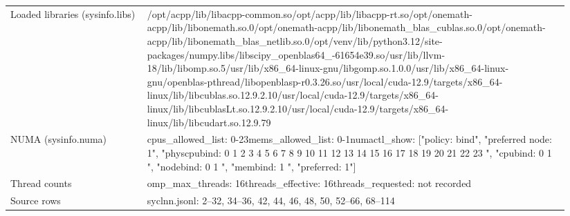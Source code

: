 \begin{longtable}{>{\raggedright\arraybackslash}p{0.23\linewidth}>{\raggedright\arraybackslash}p{0.71\linewidth}}
Loaded libraries (sysinfo.libs) & /\allowbreak{}opt/\allowbreak{}acpp/\allowbreak{}lib/\allowbreak{}libacpp-common.so\newline /\allowbreak{}opt/\allowbreak{}acpp/\allowbreak{}lib/\allowbreak{}libacpp-rt.so\newline /\allowbreak{}opt/\allowbreak{}onemath-acpp/\allowbreak{}lib/\allowbreak{}libonemath.so.0\newline /\allowbreak{}opt/\allowbreak{}onemath-acpp/\allowbreak{}lib/\allowbreak{}libonemath\_\allowbreak{}blas\_\allowbreak{}cublas.so.0\newline /\allowbreak{}opt/\allowbreak{}onemath-acpp/\allowbreak{}lib/\allowbreak{}libonemath\_\allowbreak{}blas\_\allowbreak{}netlib.so.0\newline /\allowbreak{}opt/\allowbreak{}venv/\allowbreak{}lib/\allowbreak{}python3.12/\allowbreak{}site-packages/\allowbreak{}numpy.libs/\allowbreak{}libscipy\_\allowbreak{}openblas64\_\allowbreak{}-61654e39.so\newline /\allowbreak{}usr/\allowbreak{}lib/\allowbreak{}llvm-18/\allowbreak{}lib/\allowbreak{}libomp.so.5\newline /\allowbreak{}usr/\allowbreak{}lib/\allowbreak{}x86\_\allowbreak{}64-linux-gnu/\allowbreak{}libgomp.so.1.0.0\newline /\allowbreak{}usr/\allowbreak{}lib/\allowbreak{}x86\_\allowbreak{}64-linux-gnu/\allowbreak{}openblas-pthread/\allowbreak{}libopenblasp-r0.3.26.so\newline /\allowbreak{}usr/\allowbreak{}local/\allowbreak{}cuda-12.9/\allowbreak{}targets/\allowbreak{}x86\_\allowbreak{}64-linux/\allowbreak{}lib/\allowbreak{}libcublas.so.12.9.2.10\newline /\allowbreak{}usr/\allowbreak{}local/\allowbreak{}cuda-12.9/\allowbreak{}targets/\allowbreak{}x86\_\allowbreak{}64-linux/\allowbreak{}lib/\allowbreak{}libcublasLt.so.12.9.2.10\newline /\allowbreak{}usr/\allowbreak{}local/\allowbreak{}cuda-12.9/\allowbreak{}targets/\allowbreak{}x86\_\allowbreak{}64-linux/\allowbreak{}lib/\allowbreak{}libcudart.so.12.9.79 \\
NUMA (sysinfo.numa) & cpus\_\allowbreak{}allowed\_\allowbreak{}list: 0-23\newline mems\_\allowbreak{}allowed\_\allowbreak{}list: 0-1\newline numactl\_\allowbreak{}show: ["policy: bind", "preferred node: 1", "physcpubind: 0 1 2 3 4 5 6 7 8 9 10 11 12 13 14 15 16 17 18 19 20 21 22 23 ", "cpubind: 0 1 ", "nodebind: 0 1 ", "membind: 1 ", "preferred: 1"] \\
Thread counts & omp\_\allowbreak{}max\_\allowbreak{}threads: 16\newline threads\_\allowbreak{}effective: 16\newline threads\_\allowbreak{}requested: not recorded \\
Source rows & syclnn.jsonl: 2–32, 34–36, 42, 44, 46, 48, 50, 52–66, 68–114 \\
\end{longtable}
